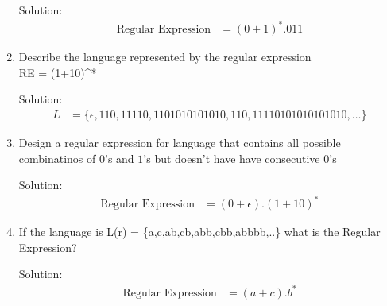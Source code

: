 \documentclass[12pt]{article}
\begin{document}
\begin{enumerate}
  Solution:
  \begin{align*}
  \text{Regular Expression} &= (0+1)^*.011
  \end{align*}
  
  
  \item Describe the language represented by the regular expression \\ RE = (1+10)^*

  Solution:
  \begin{align*}
  L&= \{\epsilon,110,11110,1101010101010,110,11110101010101010, \dots \}
  \end{align*}
  
  \item Design a regular expression for language that contains all possible combinatinos of $0$'s and $1$'s but doesn't have have consecutive $0$'s
  
  Solution:
  \begin{align*}
  \text{Regular Expression} &= (0+\epsilon).(1+10)^* 
  \end{align*}
  
  
  \item If the language is L(r) = \{a,c,ab,cb,abb,cbb,abbbb,..\} what is the Regular Expression?
  
  Solution:
  \begin{align*}
  \text{Regular Expression} &= (a+c).b^*
  \end{align*}
  
\end{enumerate}


































\iffalse
\end{document}

